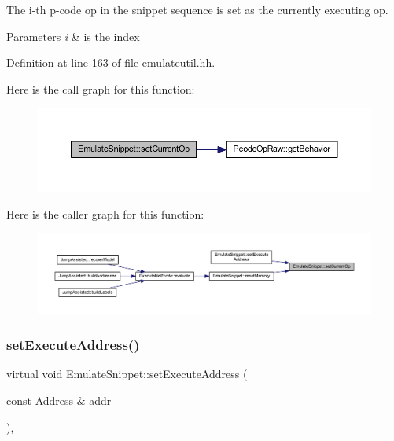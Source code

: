 The i-\/th p-\/code op in the snippet sequence is set as the currently executing op. 
\begin{DoxyParams}{Parameters}
{\em i} & is the index \\
\hline
\end{DoxyParams}


Definition at line 163 of file emulateutil.\+hh.

Here is the call graph for this function\+:
\nopagebreak
\begin{figure}[H]
\begin{center}
\leavevmode
\includegraphics[width=350pt]{class_emulate_snippet_ace37ff31a80e1f296221195eeec4a4fb_cgraph}
\end{center}
\end{figure}
Here is the caller graph for this function\+:
\nopagebreak
\begin{figure}[H]
\begin{center}
\leavevmode
\includegraphics[width=350pt]{class_emulate_snippet_ace37ff31a80e1f296221195eeec4a4fb_icgraph}
\end{center}
\end{figure}
\mbox{\label{class_emulate_snippet_a22a13101a25f73f33a9b10f20ebf018a}} 
\subsubsection{\texorpdfstring{setExecuteAddress()}{setExecuteAddress()}}
{\footnotesize\ttfamily virtual void Emulate\+Snippet\+::set\+Execute\+Address (\begin{DoxyParamCaption}\item[{const \mbox{\hyperlink{class_address}{Address}} \&}]{addr }\end{DoxyParamCaption})\hspace{0.3cm}{\ttfamily [inline]}, {\ttfamily [virtual]}}



